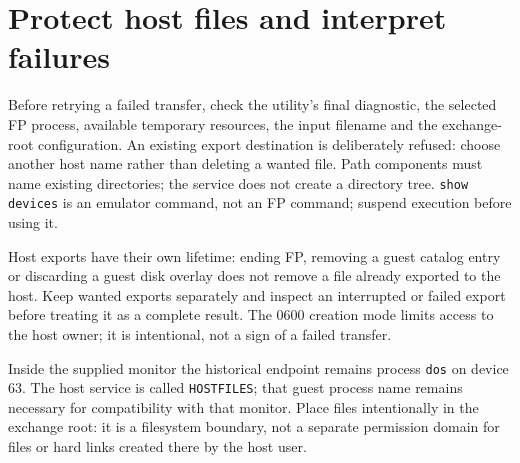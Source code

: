 \section{Protect host files and interpret failures}\label{protect-host-files-and-interpret-failures}

Before retrying a failed transfer, check the utility's final diagnostic, the selected FP process, available temporary resources, the input filename and the exchange-root configuration. An existing export destination is deliberately refused: choose another host name rather than deleting a wanted file. Path components must name existing directories; the service does not create a directory tree. \passthrough{\lstinline!show devices!} is an emulator command, not an FP command; suspend execution before using it.

Host exports have their own lifetime: ending FP, removing a guest catalog entry or discarding a guest disk overlay does not remove a file already exported to the host. Keep wanted exports separately and inspect an interrupted or failed export before treating it as a complete result. The 0600 creation mode limits access to the host owner; it is intentional, not a sign of a failed transfer.

Inside the supplied monitor the historical endpoint remains process \passthrough{\lstinline!dos!} on device 63. The host service is called \passthrough{\lstinline!HOSTFILES!}; that guest process name remains necessary for compatibility with that monitor. Place files intentionally in the exchange root: it is a filesystem boundary, not a separate permission domain for files or hard links created there by the host user.
